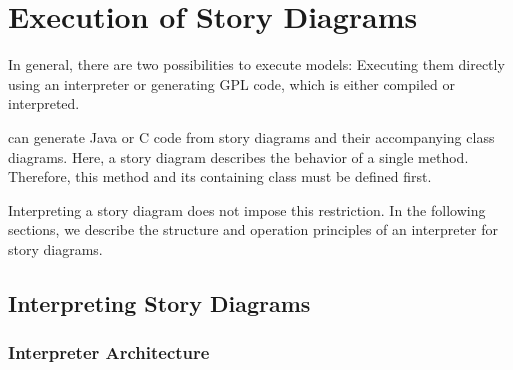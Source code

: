 \chapter{Execution of Story Diagrams} \label{sec:Execution}

In general, there are two possibilities to execute models: Executing them directly using an interpreter \cite{GHS09} or generating GPL code, which is either compiled or interpreted.

\fuj can generate Java or C code from story diagrams and their accompanying class diagrams. 
Here, a story diagram describes the behavior of a single method. 
Therefore, this method and its containing class must be defined first.

Interpreting a story diagram does not impose this restriction.
In the following sections, we describe the structure and operation principles of an interpreter for story diagrams.


\section{Interpreting Story Diagrams}
\label{sec:InterpretingStoryDiagrams}

\subsection{Interpreter Architecture}

